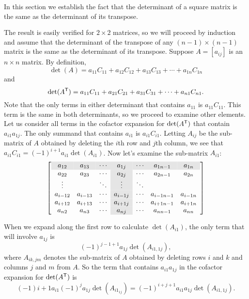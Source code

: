 
In this section we establish the fact that the determinant of a square matrix is the same as the determinant of its transpose.  

The result is easily verified for $2 \times 2$ matrices, so we will proceed by induction and assume that the determinant of the transpose of any $(n-1) \times (n-1)$ matrix is the same as the determinant of its transpose. Suppose $A = [a_{ij}]$ is an $n \times n$ matrix. By definition,
\[\det(A) = a_{11}C_{11} + a_{12}C_{12} + a_{13}C_{13} + \cdots + a_{1n}C_{1n}\]
and
\[\det(A^{\mathsf{T}}) = a_{11}C_{11} + a_{21}C_{21} + a_{31}C_{31} + \cdots + a_{n1}C_{n1}.\]
Note that the only terms in either determinant that contains $a_{11}$ is $a_{11}C_{11}$. This term is the same in both determinants, so we proceed to examine other elements. Let us consider all terms in the cofactor expansion for $\det(A^{\mathsf{T}})$ that contain $a_{i1}a_{1j}$. The only summand that contains $a_{i1}$ is $a_{i1}C_{i1}$. Letting $A_{ij}$ be the sub-matrix of $A$ obtained by deleting the $i$th row and $j$th column, we see that $a_{i1}C_{i1} = (-1)^{i+1}a_{i1}\det(A_{i1})$. Now let's examine the sub-matrix $A_{i1}$:
\[\left[ \begin{array}{ccc>{\columncolor{Gray}}cccc}
\rowcolor{Gray}
a_{12} & a_{13} & \cdots    &a_{1j} &\cdots & a_{1n-1} & a_{1n} \\
a_{22} & a_{23} & \cdots    &a_{2j} &\cdots & a_{2n-1} & a_{2n} \\
\vdots &       & \ddots    & \vdots          &\ddots & & \\
a_{i-12} & a_{i-13} & \cdots    &a_{i-1j} &\cdots & a_{i-1n-1} & a_{i-1n} \\
a_{i+12} & a_{i+13} & \cdots    &a_{i+1j} &\cdots & a_{i+1n-1} & a_{i+1n} \\
a_{n2} & a_{n3} & \cdots    &a_{nj} &\cdots & a_{nn-1} & a_{nn}
\end{array} \right] \]

When we expand along the first row to calculate $\det(A_{i1})$, the only term that will involve $a_{1j}$ is 
\[(-1)^{j-1+1}a_{1j}\det(A_{i1, 1j}),\]
where $A_{ik,jm}$ denotes the sub-matrix of $A$ obtained by deleting rows $i$ and $k$ and columns $j$ and $m$ from $A$. So the term that contains $a_{i1}a_{1j}$ in the cofactor expansion for $\det(A^{\mathsf{T}})$ is 
\begin{equation} \label{eq:det_transpose_1}
(-1){i+1}a_{i1}(-1)^{j}a_{1j}\det(A_{i1_{1j}}) = (-1)^{i+j+1} a_{i1}a_{1j}\det(A_{i1, 1j}).
\end{equation}

